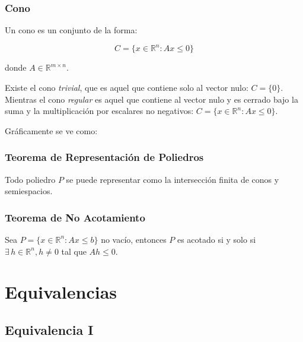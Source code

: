 \documentclass{article}
\begin{document}
\subsubsection{Cono}

Un cono es un conjunto de la forma:

\begin{equation*}
    C = \{x \in \mathbb{R}^n: Ax \leq 0\}
\end{equation*}

donde $A \in \mathbb{R}^{m \times n}$.

Existe el cono \textit{trivial}, que es aquel que contiene solo al vector nulo: $C = \{0\}$. Mientras el cono \textit{regular} es aquel que contiene al vector nulo y es cerrado bajo la suma y la multiplicación por escalares no negativos: $C = \{x \in \mathbb{R}^n: Ax \leq 0\}$.

Gráficamente se ve como:

\begin{center}
\end{center}

\subsubsection{Teorema de Representación de Poliedros}

Todo poliedro $P$ se puede representar como la intersección finita de conos y semiespacios.

\subsubsection{Teorema de No Acotamiento}

Sea $P = \{x \in \mathbb{R}^n: Ax \leq b\}$ no vacío, entonces $P$ es acotado si y solo si $\exists\, h \in \mathbb{R}^n, h \neq 0$ tal que $A h \leq 0$.

\section{Equivalencias}

\subsection{Equivalencia I}
\end{document}
